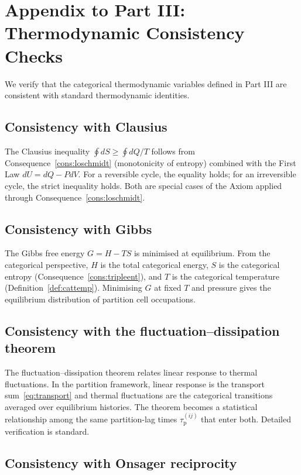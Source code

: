 \documentclass[11pt,twocolumn,a4paper]{article}
\theoremstyle{axiomstyle}
\theoremstyle{conseqstyle}
\theoremstyle{definition}
\theoremstyle{remark}
\newcommand{\taup}{\tau_{\mathrm{p}}}
\begin{document}
\section*{Appendix to Part III: Thermodynamic Consistency Checks}

We verify that the categorical thermodynamic variables defined in Part III are consistent with standard thermodynamic identities.

\subsection{Consistency with Clausius}

The Clausius inequality $\oint dS\ge\oint dQ/T$ follows from Consequence~\ref{cons:loschmidt} (monotonicity of entropy) combined with the First Law $dU=dQ-PdV$. For a reversible cycle, the equality holds; for an irreversible cycle, the strict inequality holds. Both are special cases of the Axiom applied through Consequence~\ref{cons:loschmidt}.

\subsection{Consistency with Gibbs}

The Gibbs free energy $G=H-TS$ is minimised at equilibrium. From the categorical perspective, $H$ is the total categorical energy, $S$ is the categorical entropy (Consequence~\ref{cons:tripleent}), and $T$ is the categorical temperature (Definition~\ref{def:cattemp}). Minimising $G$ at fixed $T$ and pressure gives the equilibrium distribution of partition cell occupations.

\subsection{Consistency with the fluctuation--dissipation theorem}

The fluctuation--dissipation theorem relates linear response to thermal fluctuations. In the partition framework, linear response is the transport sum~\eqref{eq:transport} and thermal fluctuations are the categorical transitions averaged over equilibrium histories. The theorem becomes a statistical relationship among the same partition-lag times $\taup^{(ij)}$ that enter both. Detailed verification is standard.

\subsection{Consistency with Onsager reciprocity}
\end{document}
